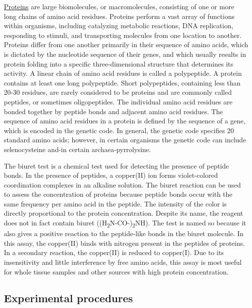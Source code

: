 \href{https://en.wikipedia.org/wiki/Protein}{Proteins} are large
biomolecules, or macromolecules, consisting of one or more long chains
of amino acid residues. Proteins perform a vast array of functions
within organisms, including catalyzing metabolic reactions, DNA
replication, responding to stimuli, and transporting molecules from one
location to another. Proteins differ from one another primarily in their
sequence of amino acids, which is dictated by the nucleotide sequence of
their genes, and which usually results in protein folding into a
specific three-dimensional structure that determines its activity. A
linear chain of amino acid residues is called a polypeptide. A protein
contains at least one long polypeptide. Short polypeptides, containing
less than 20-30 residues, are rarely considered to be proteins and are
commonly called peptides, or sometimes oligopeptides. The individual
amino acid residues are bonded together by peptide bonds and adjacent
amino acid residues. The sequence of amino acid residues in a protein is
defined by the sequence of a gene, which is encoded in the genetic code.
In general, the genetic code specifies 20 standard amino acids; however,
in certain organisms the genetic code can include selenocysteine and-in
certain archaea-pyrrolysine.

The biuret test is a chemical test used for detecting the presence of
peptide bonds. In the presence of peptides, a copper(II) ion forms
violet-colored coordination complexes in an alkaline solution. The
biuret reaction can be used to assess the concentration of proteins
because peptide bonds occur with the same frequency per amino acid in
the peptide. The intensity of the color is directly proportional to the
protein concentration. Despite its name, the reagent does not in fact
contain biuret ((H\textsubscript{2}N-CO-)\textsubscript{2}NH). The test
is named so because it also gives a positive reaction to the
peptide-like bonds in the biuret molecule. In this assay, the copper(II)
binds with nitrogen present in the peptides of proteins. In a secondary
reaction, the copper(II) is reduced to copper(I). Due to its
insensitivity and little interference by free amino acids, this assay is
most useful for whole tissue samples and other sources with high protein
concentration.

\subsection{Experimental procedures}\label{experimental-procedures-3}

